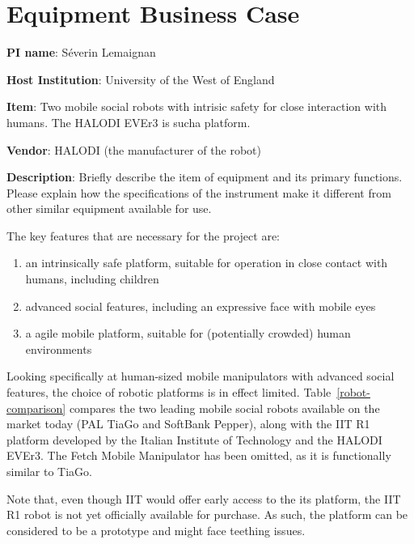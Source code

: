 \chapter{Equipment Business Case}


\textbf{PI name}: Séverin Lemaignan

\textbf{Host Institution}: University of the West of England

\textbf{Item}: Two mobile social robots with intrisic safety for close interaction with humans. The HALODI EVEr3 is sucha  platform.

\textbf{Vendor}: HALODI (the manufacturer of the robot)

\textbf{Description}: Briefly describe the item of equipment and its primary functions. Please explain how the specifications of the instrument make it different from other similar equipment available for use.

The key features that are necessary for the project are:

\begin{enumerate}
    \item an intrinsically safe platform, suitable for operation in close contact with humans, including children
    \item advanced social features, including an expressive face with mobile eyes
    \item a agile mobile platform, suitable for (potentially crowded) human environments
\end{enumerate}


Looking specifically at human-sized mobile manipulators with advanced social
features, the choice of robotic platforms is in effect limited.
Table~\ref{robot-comparison} compares the two leading mobile social robots
available on the market today (PAL TiaGo and SoftBank Pepper), along with the
IIT R1 platform developed by the Italian Institute of Technology and the HALODI
EVEr3. The Fetch Mobile Manipulator has been omitted, as it is functionally
similar to TiaGo.

Note that, even though IIT would offer early access to the its platform,
the IIT R1 robot is not yet officially available for purchase. As such, the
platform can be considered to be a prototype and might face teething issues.


